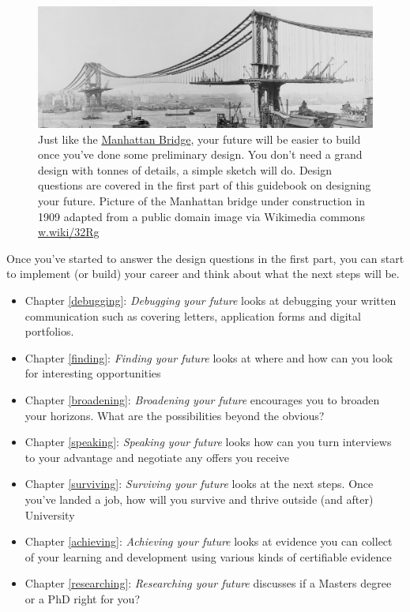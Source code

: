 \documentclass[
]{book}
\providecommand{\tightlist}{%
  \setlength{\itemsep}{0pt}\setlength{\parskip}{0pt}}
\begin{document}
\begin{figure}

{\centering \includegraphics[width=1\linewidth]{images/manhattan_bridge} 

}

\caption{Just like the \href{https://en.wikipedia.org/wiki/Manhattan_Bridge}{Manhattan Bridge}, your future will be easier to build once you've done some preliminary design. You don't need a grand design with tonnes of details, a simple sketch will do. Design questions are covered in the first part of this guidebook on designing your future. Picture of the Manhattan bridge under construction in 1909 adapted from a public domain image via Wikimedia commons \href{https://w.wiki/32Rg}{w.wiki/32Rg}}\label{fig:manhattan-fig}
\end{figure}



Once you've started to answer the design questions in the first part, you can start to implement (or build) your career and think about what the next steps will be.

\begin{itemize}
\tightlist
\item
  Chapter \ref{debugging}: \emph{Debugging your future} looks at debugging your written communication such as covering letters, application forms and digital portfolios.
\item
  Chapter \ref{finding}: \emph{Finding your future} looks at where and how can you look for interesting opportunities
\item
  Chapter \ref{broadening}: \emph{Broadening your future} encourages you to broaden your horizons. What are the possibilities beyond the obvious?
\item
  Chapter \ref{speaking}: \emph{Speaking your future} looks how can you turn interviews to your advantage and negotiate any offers you receive
\item
  Chapter \ref{surviving}: \emph{Surviving your future} looks at the next steps. Once you've landed a job, how will you survive and thrive outside (and after) University
\item
  Chapter \ref{achieving}: \emph{Achieving your future} looks at evidence you can collect of your learning and development using various kinds of certifiable evidence
\item
  Chapter \ref{researching}: \emph{Researching your future} discusses if a Masters degree or a PhD right for you?
\end{itemize}
\end{document}
